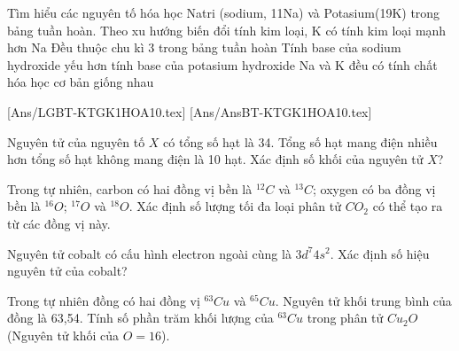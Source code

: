 \documentclass[Main.tex]{subfiles}
\begin{document}
		\begin{ex}
			Tìm hiểu các nguyên tố hóa học Natri (sodium, 11Na) và Potasium(19K) trong bảng tuần hoàn.
			\choiceTF
			{Theo xu hướng biến đổi tính kim loại, K có tính kim loại mạnh hơn Na}
			{Đều thuộc chu kì 3 trong bảng tuần hoàn}
			{Tính base của sodium hydroxide yếu hơn tính base của potasium hydroxide}
			{Na và K đều có tính chất hóa học cơ bản giống nhau}
			\loigiai{}
		\end{ex}
	[Ans/LGBT-KTGK1HOA10.tex]
	[Ans/AnsBT-KTGK1HOA10.tex]
		\begin{bt}
			Nguyên tử của nguyên tố \(X \) có tổng số hạt là 34. Tổng số hạt mang điện nhiều hơn tổng số hạt không mang điện là 10 hạt. Xác định số khối của nguyên tử \(X \)?
			\shortans{}
			\loigiai{}
		\end{bt}
		
		\begin{bt}
			Trong tự nhiên, carbon có hai đồng vị bền là \(^{12}C \) và \(^{13}C \); oxygen có ba đồng vị bền là \(^{16}O \); \(^{17}O \) và \(^{18}O \). Xác định số lượng tối đa loại phân tử \(CO_2 \) có thể tạo ra từ các đồng vị này.
			\shortans{}
			\loigiai{}
		\end{bt}
		
		\begin{bt}
			Nguyên tử cobalt có cấu hình electron ngoài cùng là \(3d^7 4s^2 \). Xác định số hiệu nguyên tử của cobalt?
			\shortans{}
			\loigiai{}
		\end{bt}
		
		\begin{bt}
			Trong tự nhiên đồng có hai đồng vị \(^{63}Cu \) và \(^{65}Cu \). Nguyên tử khối trung bình của đồng là 63,54. Tính số phần trăm khối lượng của \(^{63}Cu \) trong phân tử \(Cu_2O \) (Nguyên tử khối của \(O=16 \)).
			\shortans{}
			\loigiai{}
		\end{bt}
		
\end{document}
